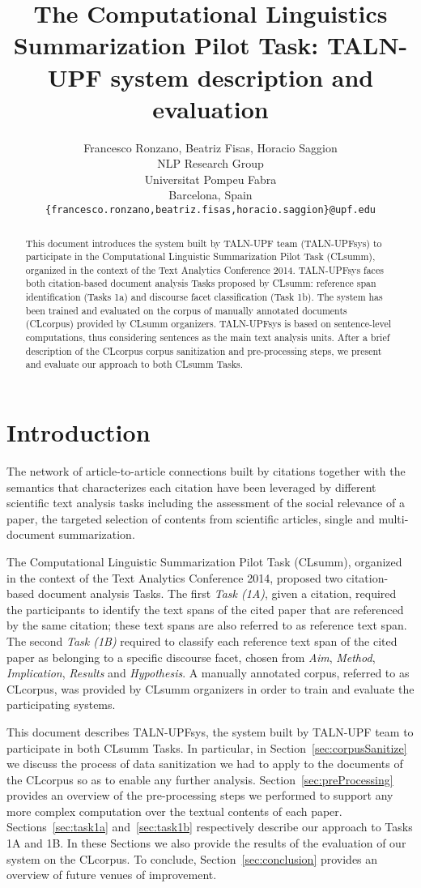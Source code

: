 \documentclass[11pt]{article}
\title{The Computational Linguistics Summarization Pilot Task: \newline TALN-UPF system description and evaluation}
\author{Francesco Ronzano, Beatriz Fisas, Horacio Saggion \\
  NLP Research Group \\
  Universitat Pompeu Fabra \\
  Barcelona, Spain \\
  {\tt \{francesco.ronzano,beatriz.fisas,horacio.saggion\}@upf.edu} \\}
\date{}
\begin{document}
\maketitle
\begin{abstract}
This document introduces the system built by TALN-UPF team (TALN-UPFsys) to participate in the Computational Linguistic Summarization Pilot Task (CLsumm), organized in the context of the Text Analytics Conference 2014. TALN-UPFsys faces both citation-based document analysis Tasks proposed by CLsumm: reference span identification (Tasks 1a) and discourse facet classification (Task 1b). The system has been trained and evaluated on the corpus of manually annotated documents (CLcorpus) provided by CLsumm organizers. TALN-UPFsys is based on sentence-level computations, thus considering sentences as the main text analysis units.
After a brief description of the CLcorpus corpus sanitization and pre-processing steps, we present and evaluate our approach to both CLsumm Tasks.


\end{abstract}

\section{Introduction}
\label{sec:intro}
The network of article-to-article connections built by citations together with the semantics that characterizes each citation have been leveraged by different scientific text analysis tasks including the assessment of the social relevance of a paper, the targeted selection of contents from scientific articles, single and multi-document summarization.

The Computational Linguistic Summarization Pilot Task (CLsumm), organized in the context of the Text Analytics Conference 2014, proposed two citation-based document analysis Tasks. The first \textit{Task (1A)}, given a citation, required the participants to identify the text spans of the cited paper that are referenced by the same citation; these text spans are also referred to as reference text span. The second \textit{Task (1B)} required to classify each reference text span of the cited paper as belonging to a specific discourse facet, chosen from \textit{Aim}, \textit{Method}, \textit{Implication}, \textit{Results} and \textit{Hypothesis}. A manually annotated corpus, referred to as CLcorpus, was provided by CLsumm organizers in order to train and evaluate the participating systems.

This document describes TALN-UPFsys, the system built by TALN-UPF team to participate in both CLsumm Tasks. In particular, in Section~\ref{sec:corpusSanitize} we discuss the process of data sanitization we had to apply to the documents of the CLcorpus so as to enable any further analysis. Section~\ref{sec:preProcessing} provides an overview of the pre-processing steps we performed to support any more complex computation over the textual contents of each paper. Sections~\ref{sec:task1a} and~\ref{sec:task1b} respectively describe our approach to Tasks 1A and 1B. In these Sections we also provide the results of the evaluation of our system on the CLcorpus. To conclude, Section~\ref{sec:conclusion} provides an overview of future venues of improvement.
\end{document}
